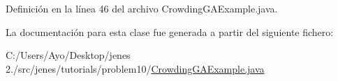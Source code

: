 Definición en la línea 46 del archivo Crowding\-G\-A\-Example.\-java.



La documentación para esta clase fue generada a partir del siguiente fichero\-:\begin{DoxyCompactItemize}
\item 
C\-:/\-Users/\-Ayo/\-Desktop/jenes 2./src/jenes/tutorials/problem10/\hyperlink{_crowding_g_a_example_8java}{Crowding\-G\-A\-Example.\-java}\end{DoxyCompactItemize}

